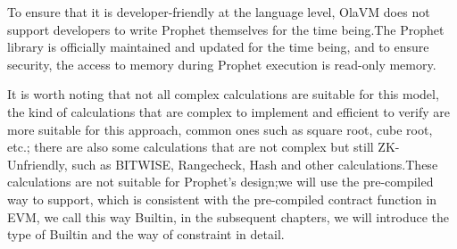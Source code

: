 To ensure that it is developer-friendly at the language level, OlaVM does not support developers to write Prophet themselves for
the time being.The Prophet library is officially maintained and updated for the time being, and to ensure security, the access to
memory during Prophet execution is read-only memory.

It is worth noting that not all complex calculations are suitable for this model, the kind of calculations that are complex to implement
and efficient to verify are more suitable for this approach, common ones such as square root, cube root, etc.; there are also some calculations
that are not complex but still ZK-Unfriendly, such as BITWISE, Rangecheck, Hash and other calculations.These calculations are not suitable
for Prophet's design;we will use the pre-compiled way to support, which is consistent with the pre-compiled contract function in EVM, we
call this way Builtin, in the subsequent chapters, we will introduce the type of Builtin and the way of constraint in detail.